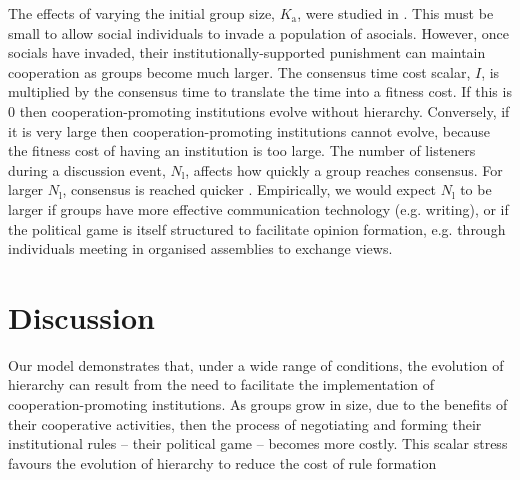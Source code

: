 \documentclass{rstb}
\begin{document}
\begin{linenumbers}
The effects of varying the initial group size, $K_\mathrm{a}$, were studied in \cite{Powers:2013:a}. This must be small to allow social individuals to invade a population of asocials. However, once socials have invaded, their institutionally-supported punishment can maintain cooperation as groups become much larger. The consensus time cost scalar, $I$, is multiplied by the consensus time to translate the time into a fitness cost. If this is 0 then cooperation-promoting institutions evolve without hierarchy. Conversely, if it is very large then cooperation-promoting institutions cannot evolve, because the fitness cost of having an institution is too large. The number of listeners during a discussion event, $N_\mathrm{l}$, affects how quickly a group reaches consensus. For larger $N_\mathrm{l}$, consensus is reached quicker \cite{Perret:2022:a}. Empirically, we would expect $N_\mathrm{l}$ to be larger if groups have more effective communication technology (e.g. writing), or if the political game is itself structured to facilitate opinion formation, e.g. through individuals meeting in organised assemblies to exchange views.  

\section{Discussion}
Our model demonstrates that, under a wide range of conditions, the evolution of hierarchy can result from the need to facilitate the implementation of cooperation-promoting institutions. As groups grow in size, due to the benefits of their cooperative activities, then the process of negotiating and forming their institutional rules -- their political game -- becomes more costly. This scalar stress \cite{Johnson:1982:a} favours the evolution of hierarchy to reduce the cost of rule formation 


\end{linenumbers}
\end{document}
